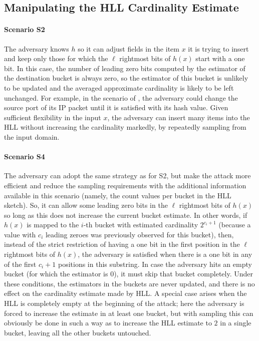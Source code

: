 \documentclass{IEEEtran}
\begin{document}
\subsection{Manipulating the HLL Cardinality Estimate}

\noindent\paragraph{Scenario S2} The adversary knows $h$ so it can adjust fields in the item $x$ it is trying to insert and keep only those for which the $\ell$ rightmost bits of $h(x)$ start with a one bit. In this case, the number of leading zero bits computed by the estimator of the destination bucket is always zero, so the estimator of this bucket is unlikely to be updated and the averaged approximate cardinality is likely to be left unchanged. For example, in the scenario of \cite{portscanhll}, the adversary could change the source port of its IP packet until it is satisfied with its hash value. Given sufficient flexibility in the input $x$, the adversary can insert many items into the HLL without increasing the cardinality markedly, by repeatedly sampling from the input domain.

\noindent\paragraph{Scenario S4} The adversary can adopt the same strategy as for S2, but make the attack more efficient and reduce the sampling requirements with the additional information available in this scenario (namely, the count values per bucket in the HLL sketch). So, it can allow some leading zero bits in the $\ell$ rightmost bits of $h(x)$ so long as this does not increase the current bucket estimate. In other words, if $h(x)$ is mapped to the $i$-th bucket with estimated cardinality $2^{c_i + 1}$ (because a value with $c_i$ leading zeroes was previously observed for this bucket), then, instead of the strict restriction of having a one bit in the first position in the $\ell$ rightmost bits of $h(x)$, the adversary is satisfied when there is a one bit in any of the first $c_i+1$ positions in this substring. In case the adversary hits an empty bucket (for which the estimator is 0), it must skip that bucket completely. Under these conditions, the estimators in the buckets are never updated, and there is no effect on the cardinality estimate made by HLL.  A special case arises when the HLL is completely empty at the beginning of the attack; here the adversary is forced to increase the estimate in at least one bucket, but with sampling this can obviously be done in such a way as to increase the HLL estimate to $2$ in a single bucket, leaving all the other buckets untouched.
\end{document}
